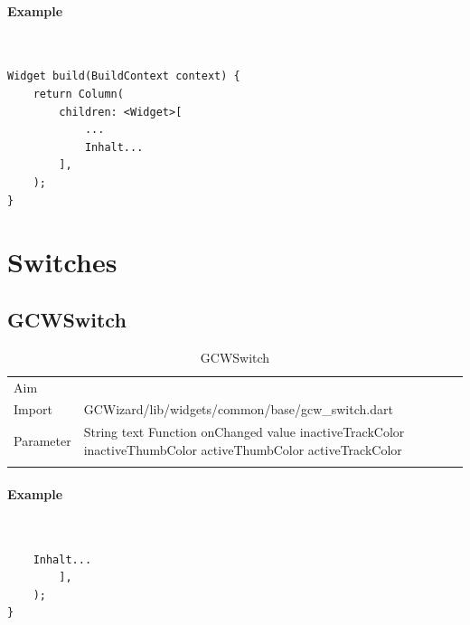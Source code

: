 \paragraph*{Example} \,
\begin{lstlisting}
Widget build(BuildContext context) {
    return Column(
        children: <Widget>[
            ...
            Inhalt...
        ],
    );
}
\end{lstlisting}
\label{fig: ExampleGCWToolBar}

\newpage
\section{Switches}
\subsection{GCWSwitch}
\label{fig: GCWSwitch}
\begin{table}[H]
\begin{tabular}[h]{p{2cm}p{9cm}}
    \caption{GCWSwitch}
    Aim       & \\
    Import    & GCWizard/lib/widgets/common/base/gcw\_switch.dart\\
    Parameter & String text\newline
                Function onChanged\newline
                value\newline
                inactiveTrackColor\newline
                inactiveThumbColor\newline
                activeThumbColor\newline
                activeTrackColor\\
    \label{tab:GCWSwitch}
\end{tabular}
\end{table}
\paragraph*{Example} \,
\begin{lstlisting}
    Inhalt...
        ],
    );
}
\end{lstlisting}
\label{fig: ExampleGCWSwitch}

